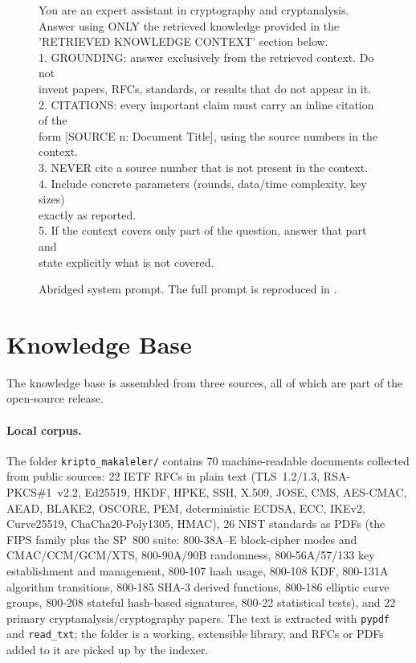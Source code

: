 \documentclass[version=submission]{iacrcc}
\begin{document}
\begin{figure}[t]
\centering
\small
\begin{minipage}{0.92\linewidth}\ttfamily\footnotesize
\noindent You are an expert assistant in cryptography and cryptanalysis.\\
Answer using ONLY the retrieved knowledge provided in the\\
'RETRIEVED KNOWLEDGE CONTEXT' section below.\\[1mm]
1. GROUNDING: answer exclusively from the retrieved context. Do not\\
   invent papers, RFCs, standards, or results that do not appear in it.\\
2. CITATIONS: every important claim must carry an inline citation of the\\
   form [SOURCE n: Document Title], using the source numbers in the context.\\
3. NEVER cite a source number that is not present in the context.\\
4. Include concrete parameters (rounds, data/time complexity, key sizes)\\
   exactly as reported.\\
5. If the context covers only part of the question, answer that part and\\
   state explicitly what is not covered.
\end{minipage}
\caption{Abridged system prompt. The full prompt is reproduced in
.}
\label{fig:prompt}
\end{figure}

\section{Knowledge Base}
\label{sec:kb}

The knowledge base is assembled from three sources, all of which are part of
the open-source release.

\paragraph{Local corpus.}
The folder \texttt{kripto\_makaleler/} contains 70 machine-readable documents
collected from public sources: 22 IETF RFCs in plain text (TLS~1.2/1.3,
RSA-PKCS\#1~v2.2, Ed25519, HKDF, HPKE, SSH, X.509, JOSE, CMS, AES-CMAC,
AEAD, BLAKE2, OSCORE, PEM, deterministic ECDSA, ECC, IKEv2, Curve25519,
ChaCha20-Poly1305, HMAC), 26 NIST standards as PDFs (the FIPS family plus
the SP~800 suite: 800-38A--E block-cipher modes and CMAC/CCM/GCM/XTS,
800-90A/90B randomness, 800-56A/57/133 key establishment and management,
800-107 hash usage, 800-108 KDF, 800-131A algorithm transitions, 800-185
SHA-3 derived functions, 800-186 elliptic curve groups, 800-208 stateful
hash-based signatures, 800-22 statistical tests), and 22 primary
cryptanalysis/cryptography papers. The text is extracted with
\texttt{pypdf} and \texttt{read\_txt}; the folder is a working, extensible
library, and RFCs or PDFs added to it are picked up by the indexer.
\end{document}

